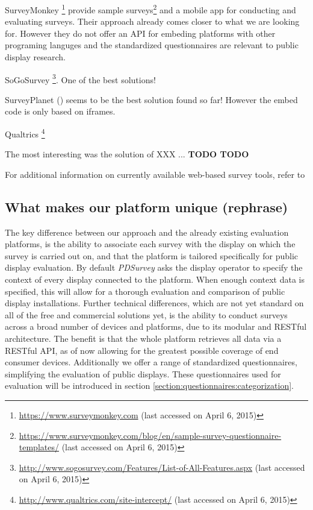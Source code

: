 		SurveyMonkey \footnote{\url{https://www.surveymonkey.com} (last accessed on April 6, 2015)} provide sample surveys\footnote{\url{https://www.surveymonkey.com/blog/en/sample-survey-questionnaire-templates/} (last accessed on April 6, 2015)} and a mobile app for conducting and evaluating surveys. Their approach already comes closer to what we are looking for. However they do not offer an API for embeding platforms with other programing languges and the standardized questionnaires are relevant to public display research.

		SoGoSurvey \footnote{\url{http://www.sogosurvey.com/Features/List-of-All-Features.aspx} (last accessed on April 6, 2015)}. One of the best solutions!

		SurveyPlanet () seems to be the best solution found so far! However the embed code is only based on iframes.

		Qualtrics \footnote{\url{http://www.qualtrics.com/site-intercept/} (last accessed on April 6, 2015)}


	The most interesting was the solution of XXX ... \textbf{TODO TODO}

	For additional information on currently available web-based survey tools, refer to \cite{Capterra2015SurveyTools, Idealware2011SurveyTools}





	\subsection{What makes our platform unique (rephrase)}
	The key difference between our approach and the already existing evaluation platforms, is the ability to associate each survey with the display on which the survey is carried out on, and that the platform is tailored specifically for public display evaluation.
	By default \textit{PDSurvey} asks the display operator to specify the context of every display connected to the platform. When enough context data is specified, this will allow for a thorough evaluation and comparison of public display installations.
	Further technical differences, which are not yet standard on all of the free and commercial solutions yet, is the ability to conduct surveys across a broad number of devices and platforms, due to its modular and RESTful architecture. The benefit is that the whole platform retrieves all data via a RESTful API, as of now allowing for the greatest possible coverage of end consumer devices. Additionally we offer a range of standardized questionnaires, simplifying the evaluation of public displays. These questionnaires used for evaluation will be introduced in section \ref{section:questionnaires:categorization}.

